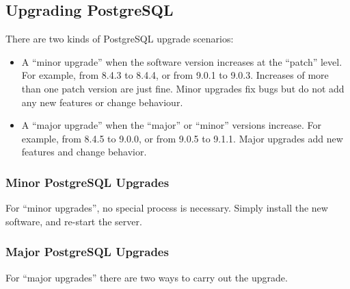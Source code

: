 \documentclass[a4paper,11pt,english]{sphinxmanual}
\begin{document}
\subsection{Upgrading PostgreSQL}
\label{\detokenize{maintenance:upgrading-postgresql}}
There are two kinds of PostgreSQL upgrade scenarios:
\begin{itemize}
\item {} 
A “minor upgrade” when the software version increases at the “patch” level. For example, from 8.4.3 to 8.4.4, or from 9.0.1 to 9.0.3. Increases of more than one patch version are just fine. Minor upgrades fix bugs but do not add any new features or change behaviour.

\item {} 
A “major upgrade” when the “major” or “minor” versions increase. For example, from 8.4.5 to 9.0.0, or from 9.0.5 to 9.1.1. Major upgrades add new features and change behavior.

\end{itemize}


\subsubsection{Minor PostgreSQL Upgrades}
\label{\detokenize{maintenance:minor-postgresql-upgrades}}
For “minor upgrades”, no special process is necessary. Simply install the new software, and re-start the server.


\subsubsection{Major PostgreSQL Upgrades}
\label{\detokenize{maintenance:major-postgresql-upgrades}}
For “major upgrades” there are two ways to carry out the upgrade.
\end{document}
